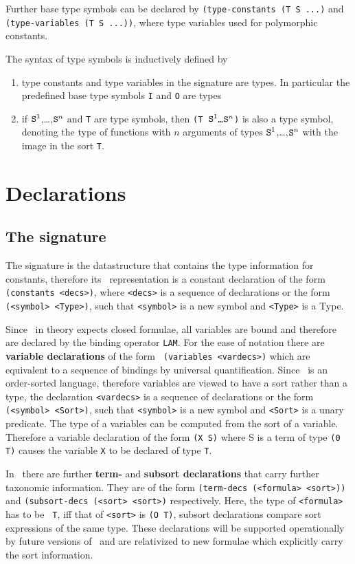 Further base type symbols can be declared by {\tt (type-constants (T S ...)} and 
{\tt (type-variables (T S ...))}, where type variables used for polymorphic constants.

The syntax of type symbols is inductively defined by
\begin{enumerate}
\item type constants and type variables in the signature are types. In particular the predefined 
      base type symbols {\tt I} and {\tt O}  are types 
\item if ${\tt S}^1$,\ldots,${\tt S}^n$ and {\tt T} are type  symbols, then
{\tt (T ${\tt S}^1$\ldots${\tt S}^n$)} is also a type  symbol,
denoting the type of functions with $n$ arguments of types
 ${\tt S}^1$,\ldots,${\tt S}^n$ with the image in the sort {\tt T}.
\end{enumerate}

\section{Declarations}
\label{sec:declarations}
\subsection{The signature}
The signature is the datastructure that contains the type information for constants, therefore its
\post\ representation is a constant declaration of the form {\tt (constants <decs>)}, where
{\tt <decs>} is a sequence of declarations or the form {\tt (<symbol> <Type>)}, such that {\tt <symbol>} is a
new symbol and {\tt <Type>} is a Type.        

Since \post\ in theory expects closed formulae, all variables are bound and therefore are declared by the
binding operator {\tt LAM}. For the ease of notation there are {\bf variable declarations} of the form {\tt
(variables <vardecs>)} which are equivalent to a sequence of bindings by universal quantification. Since
\post\ is an order-sorted language, therefore variables are viewed to have a sort rather than a type, the
declaration {\tt <vardecs>} is a sequence of declarations or the form {\tt (<symbol> <Sort>)}, such that
{\tt <symbol>} is a new symbol and {\tt <Sort>} is a unary predicate. The type of a variables can be
computed from the sort of a variable. Therefore a variable declaration of the form {\tt (X S)} where S is a
term of type {\tt (0 T)} causes the variable {\tt X} to be declared of type {\tt T}.

In \post\ there are further {\bf term-} and {\bf subsort declarations} that carry further taxonomic
information. They are of the form {\tt (term-decs (<formula> <sort>))} and 
{\tt (subsort-decs (<sort> <sort>)} respectively. Here, the type of {\tt <formula>} has to be {\tt
T}, iff that of {\tt <sort>} is {\tt (O T)}, subsort declarations compare sort expressions of the
same type. These declarations will be supported operationally by future versions of \keim\ and are
relativized to new formulae which explicitly carry the sort information.


